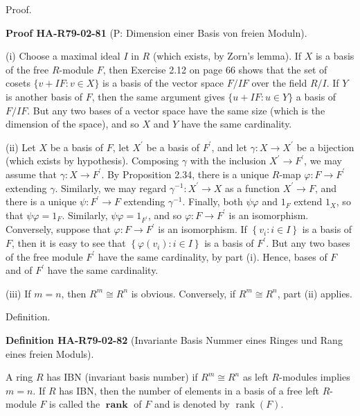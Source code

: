 \documentclass[10pt, letterpaper]{article}
\newcommand{\CustomHeading}[3]{%
  \par\medskip\noindent%
  \textbf{#1 #2} \textnormal{(#3)}.\enskip%
}
\newenvironment{DEF}[2]{\begin{unitbox}\CustomHeading{Definition}{#1}{#2}}{\end{unitbox}}
\newenvironment{PROOF}[2]{\begin{unitbox}\CustomHeading{Proof}{#1}{#2}}{\end{unitbox}}
\begin{document}
Proof.

\begin{PROOF}{HA-R79-02-81}{P: Dimension einer Basis von freien Moduln}
(i) Choose a maximal ideal $I$ in $R$ (which exists, by Zorn's lemma). If $X$ is a basis of the free $R$-module $F$, then Exercise 2.12 on page 66 shows that the set of cosets $\{v+I F: v \in X\}$ is a basis of the vector space $F / I F$ over the field $R / I$. If $Y$ is another basis of $F$, then the same argument gives $\{u+I F: u \in Y\}$ a basis of $F / I F$. But any two bases of a vector space have the same size (which is the dimension of the space), and so $X$ and $Y$ have the same cardinality.

(ii) Let $X$ be a basis of $F$, let $X^{\prime}$ be a basis of $F^{\prime}$, and let $\gamma: X \rightarrow X^{\prime}$ be a bijection (which exists by hypothesis). Composing $\gamma$ with the inclusion $X^{\prime} \rightarrow F^{\prime}$, we may assume that $\gamma: X \rightarrow F^{\prime}$. By Proposition 2.34, there is a unique $R$-map $\varphi: F \rightarrow F^{\prime}$ extending $\gamma$. Similarly, we may regard $\gamma^{-1}: X^{\prime} \rightarrow X$ as a function $X^{\prime} \rightarrow F$, and there is a unique $\psi: F^{\prime} \rightarrow F$ extending $\gamma^{-1}$. Finally, both $\psi \varphi$ and $1_{F}$ extend $1_{X}$, so that $\psi \varphi=1_{F}$. Similarly, $\psi \varphi=1_{F^{\prime}}$, and so $\varphi: F \rightarrow F^{\prime}$ is an isomorphism.\\
Conversely, suppose that $\varphi: F \rightarrow F^{\prime}$ is an isomorphism. If $\left\{v_{i}: i \in I\right\}$ is a basis of $F$, then it is easy to see that $\left\{\varphi\left(v_{i}\right): i \in I\right\}$ is a basis of $F^{\prime}$. But any two bases of the free module $F^{\prime}$ have the same cardinality, by part (i). Hence, bases of $F$ and of $F^{\prime}$ have the same cardinality.

(iii) If $m=n$, then $R^{m} \cong R^{n}$ is obvious. Conversely, if $R^{m} \cong R^{n}$, part (ii) applies.
\end{PROOF}



Definition. 

\begin{DEF}{HA-R79-02-82}{Invariante Basis Nummer eines Ringes und Rang eines freien Moduls}
A ring $R$ has IBN (invariant basis number) if $R^{m} \cong R^{n}$ as left $R$-modules implies $m=n$. If $R$ has IBN, then the number of elements in a basis of a free left $R$-module $F$ is called the $\boldsymbol{\operatorname { r a n k }}$ of $F$ and is denoted by $\operatorname{rank}(F)$.
\end{DEF}
\end{document}

